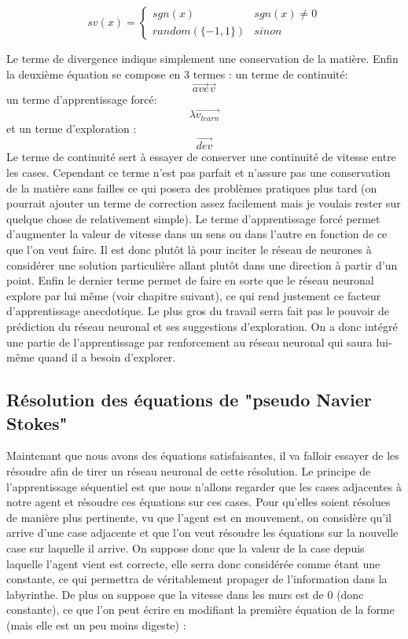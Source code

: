 \documentclass[10pt]{article}
\begin{document}
\[sv(x) = 
\begin{cases}
	sgn(x) & sgn(x) \neq 0 \\
	random(\{-1,1\}) & sinon
\end{cases}
\]


Le terme de divergence indique simplement une conservation de la matière. Enfin la deuxième équation se compose en 3 termes : un terme de continuité: 
\[\overrightarrow{ave}\overrightarrow{v}\]
un terme d'apprentissage forcé:
\[\lambda\overrightarrow{v_{learn}}\]
et un terme d'exploration :
\[\overrightarrow{dev}\]
Le terme de continuité sert à essayer de conserver une continuité de vitesse entre les cases. Cependant ce terme n'est pas parfait et n'assure pas une conservation de la matière sans failles ce qui posera des problèmes pratiques plus tard (on pourrait ajouter un terme de correction assez facilement mais je voulais rester sur quelque chose de relativement simple). Le terme d'apprentissage forcé permet d'augmenter la valeur de vitesse dans un sens ou dans l'autre en fonction de ce que l'on veut faire. Il est donc plutôt là pour inciter le réseau de neurones à considérer une solution particulière allant plutôt dans une direction à partir d'un point. Enfin le dernier terme permet de faire en sorte que le réseau neuronal explore par lui même (voir chapitre suivant), ce qui rend justement ce facteur d'apprentissage anecdotique. Le plus gros du travail serra fait pas le pouvoir de prédiction du réseau neuronal et ses suggestions d'exploration. On a donc intégré une partie de l'apprentissage par renforcement au réseau neuronal qui saura lui-même quand il a besoin d'explorer.

\subsection{Résolution des équations de "pseudo Navier Stokes"}
Maintenant que nous avons des équations satisfaisantes, il va falloir essayer de les résoudre afin de tirer un réseau neuronal de cette résolution. Le principe de l'apprentissage séquentiel est que nous n'allons regarder que les cases adjacentes à notre agent et résoudre ces équations sur ces cases. Pour qu'elles soient résolues de manière plus pertinente, vu que l'agent est en mouvement, on considère qu'il arrive d'une case adjacente et que l'on veut résoudre les équations sur la nouvelle case sur laquelle il arrive. On suppose donc que la valeur de la case depuis laquelle l'agent vient est correcte, elle serra donc considérée comme étant une constante, ce qui permettra de véritablement propager de l'information dans la labyrinthe. De plus on suppose que la vitesse dans les murs est de 0 (donc constante), ce que l'on peut écrire en modifiant la première équation de la forme (mais elle est un peu moins digeste) :
\end{document}
